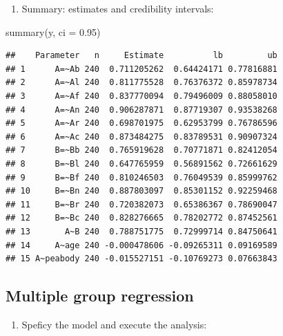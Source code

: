 \documentclass[
]{book}
\newenvironment{Shaded}{\begin{snugshade}}{\end{snugshade}}
\newcommand{\AttributeTok}[1]{\textcolor[rgb]{0.77,0.63,0.00}{#1}}
\newcommand{\FloatTok}[1]{\textcolor[rgb]{0.00,0.00,0.81}{#1}}
\newcommand{\FunctionTok}[1]{\textcolor[rgb]{0.00,0.00,0.00}{#1}}
\newcommand{\NormalTok}[1]{#1}
\providecommand{\tightlist}{%
  \setlength{\itemsep}{0pt}\setlength{\parskip}{0pt}}
\begin{document}
\begin{enumerate}
\def\labelenumi{\arabic{enumi})}
\setcounter{enumi}{4}
\tightlist
\item
  Summary: estimates and credibility intervals:
\end{enumerate}

\begin{Shaded}
\begin{Highlighting}[]
\FunctionTok{summary}\NormalTok{(y, }\AttributeTok{ci =} \FloatTok{0.95}\NormalTok{)}
\end{Highlighting}
\end{Shaded}

\begin{verbatim}
##    Parameter   n     Estimate          lb         ub
## 1      A=~Ab 240  0.711205262  0.64424171 0.77816881
## 2      A=~Al 240  0.811775528  0.76376372 0.85978734
## 3      A=~Af 240  0.837770094  0.79496009 0.88058010
## 4      A=~An 240  0.906287871  0.87719307 0.93538268
## 5      A=~Ar 240  0.698701975  0.62953799 0.76786596
## 6      A=~Ac 240  0.873484275  0.83789531 0.90907324
## 7      B=~Bb 240  0.765919628  0.70771871 0.82412054
## 8      B=~Bl 240  0.647765959  0.56891562 0.72661629
## 9      B=~Bf 240  0.810246503  0.76049539 0.85999762
## 10     B=~Bn 240  0.887803097  0.85301152 0.92259468
## 11     B=~Br 240  0.720382073  0.65386367 0.78690047
## 12     B=~Bc 240  0.828276665  0.78202772 0.87452561
## 13       A~B 240  0.788751775  0.72999714 0.84750641
## 14     A~age 240 -0.000478606 -0.09265311 0.09169589
## 15 A~peabody 240 -0.015527151 -0.10769273 0.07663843
\end{verbatim}

\hypertarget{multiple-group-regression}{%
\subsection{Multiple group regression}\label{multiple-group-regression}}

\begin{enumerate}
\def\labelenumi{\arabic{enumi})}
\tightlist
\item
  Speficy the model and execute the analysis:
\end{enumerate}
\end{document}
